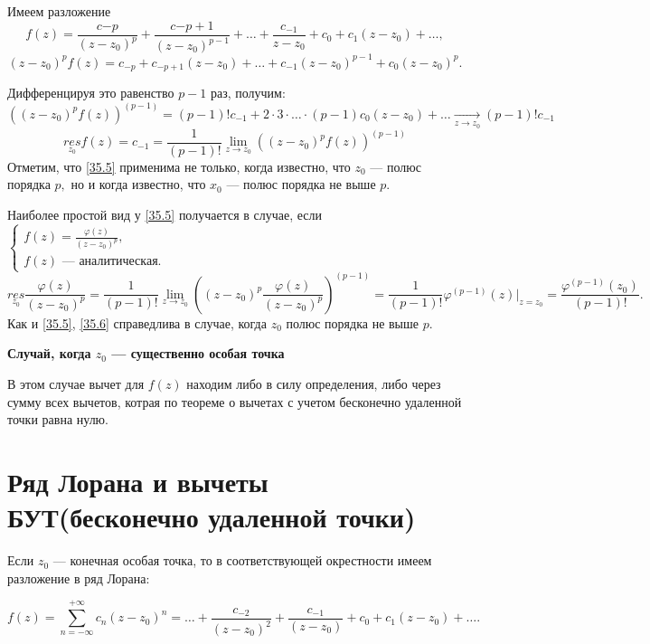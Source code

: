 \documentclass[../../main.tex]{subfiles}
\begin{document}
	Имеем разложение 
	\[
		f(z) = \frac{c{-p}}{(z-z_0)^{p}} + \frac{c{-p+1}}{(z-z_0)^{p-1}} + \ldots + 
		\frac{c_{-1}}{z-z_0} + c_0 + c_1(z-z_0) + \ldots,
	\]
	\[
		(z-z_0)^pf(z) = c_{-p} + c_{-p+1}(z-z_0) + \ldots + c_{-1}(z-z_0)^{p-1} + c_0(z-z_0)^p.
	\]
	
	Дифференцируя это равенство $p-1$ раз, получим:
	\[
		((z-z_0)^pf(z))^{(p-1)} = (p-1)!c_{-1} + 2 \cdot 3 \cdot \ldots \cdot (p-1)c_0(z-z_0) + \ldots 
		\underset{z \to z_0}{\to} (p-1)!c_{-1}
	\]
	\begin{equation} \label{35.5}
		\underset{z_0}{res} f(z) = c_{-1} = \frac{1}{(p-1)!}
		\lim\limits_{z\to z_0} ((z-z_0)^pf(z))^{(p-1)}
	\end{equation}
	Отметим, что \eqref{35.5} применима не только, когда известно, что $z_0$ --- полюс порядка $p,$ но и когда известно, что $x_0$ --- полюс порядка не выше $p.$
	
	Наиболее простой вид у \eqref{35.5} получается в случае, если $\begin{cases}
	f(z)  = \frac{\varphi(z)}{(z-z_0)^p}, \\
	f(z) \text{ --- аналитическая.}
	\end{cases}$
	\begin{equation} \label{35.6}
		\underset{z_0}{res}  \frac{\varphi(z)}{(z-z_0)^p} = \frac{1}{(p-1)!}
		 \lim\limits_{z\to z_0} \left((z-z_0)^p \frac{\varphi(z)}{(z-z_0)^p}\right)^{(p-1)} = 
		 \frac{1}{(p-1)!} \varphi^{(p-1)}(z)\bigg|_{z = z_0} = \frac{\varphi^{(p-1)}(z_0)}{(p-1)!}.
	\end{equation}
	Как и \eqref{35.5}, \eqref{35.6} справедлива в случае, когда $z_0$ полюс порядка не выше $p$.
	
	\textbf{Случай, когда $z_0$ --- существенно особая точка}
	
	В этом случае вычет для $f(z) $ находим либо в силу определения, либо через сумму всех вычетов, котрая по теореме о вычетах с учетом бесконечно удаленной точки равна нулю.
	
\section{Ряд Лорана и вычеты БУТ(бесконечно удаленной точки)}

	Если $z_0$ --- конечная особая точка, то в соответствующей окрестности имеем разложение в ряд Лорана:
	
	\[
	f(z) = \sum_{n=-\infty}^{+\infty}c_n(z-z_0)^n=\dots+
	\frac{c_{-2}}{(z-z_0)^2}+\frac{c_{-1}}{(z-z_0)}+c_0+c_1(z-z_0)+\dots .
	\] 
	
\end{document}
